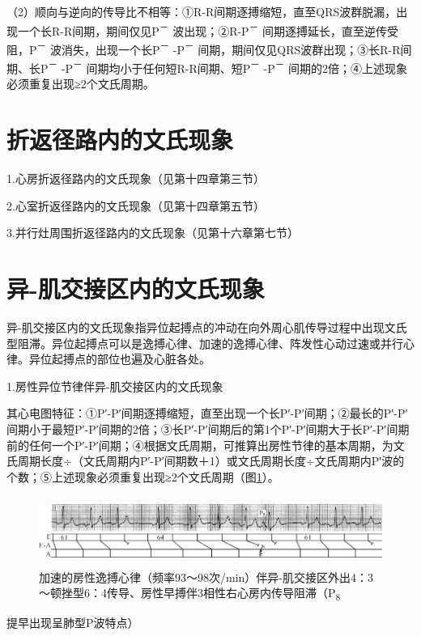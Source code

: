 （2）顺向与逆向的传导比不相等：①R-R间期逐搏缩短，直至QRS波群脱漏，出现一个长R-R间期，期间仅见P\textsuperscript{－}
波出现；②R-P\textsuperscript{－}
间期逐搏延长，直至逆传受阻，P\textsuperscript{－}
波消失，出现一个长P\textsuperscript{－} -P\textsuperscript{－}
间期，期间仅见QRS波群出现；③长R-R间期、长P\textsuperscript{－}
-P\textsuperscript{－} 间期均小于任何短R-R间期、短P\textsuperscript{－}
-P\textsuperscript{－} 间期的2倍；④上述现象必须重复出现≥2个文氏周期。

\protect\hypertarget{text00025.htmlux5cux23subid311}{}{}

\section{折返径路内的文氏现象}

1.心房折返径路内的文氏现象（见第十四章第三节）

2.心室折返径路内的文氏现象（见第十四章第五节）

3.并行灶周围折返径路内的文氏现象（见第十六章第七节）

\protect\hypertarget{text00025.htmlux5cux23subid312}{}{}

\section{异-肌交接区内的文氏现象}

异-肌交接区内的文氏现象指异位起搏点的冲动在向外周心肌传导过程中出现文氏型阻滞。异位起搏点可以是逸搏心律、加速的逸搏心律、阵发性心动过速或并行心律。异位起搏点的部位也遍及心脏各处。

1.房性异位节律伴异-肌交接区内的文氏现象

其心电图特征：①P′-P′间期逐搏缩短，直至出现一个长P′-P′间期；②最长的P′-P′间期小于最短P′-P′间期的2倍；③长P′-P′间期后的第1个P′-P′间期大于长P′-P′间期前的任何一个P′-P′间期；④根据文氏周期，可推算出房性节律的基本周期，为文氏周期长度÷（文氏周期内P′-P′间期数＋1）或文氏周期长度÷文氏周期内P′波的个数；⑤上述现象必须重复出现≥2个文氏周期（图\ref{fig18-14}）。

\begin{figure}[!htbp]
 \centering
 \includegraphics[width=5.80208in,height=0.89583in]{./images/Image00315.jpg}
 \captionsetup{justification=centering}
 \caption{加速的房性逸搏心律（频率93～98次/min）伴异-肌交接区外出4：3～顿挫型6：4传导、房性早搏伴3相性右心房内传导阻滞（P\textsubscript{8}}
 \label{fig18-14}
  \end{figure} 
提早出现呈肺型P波特点）

